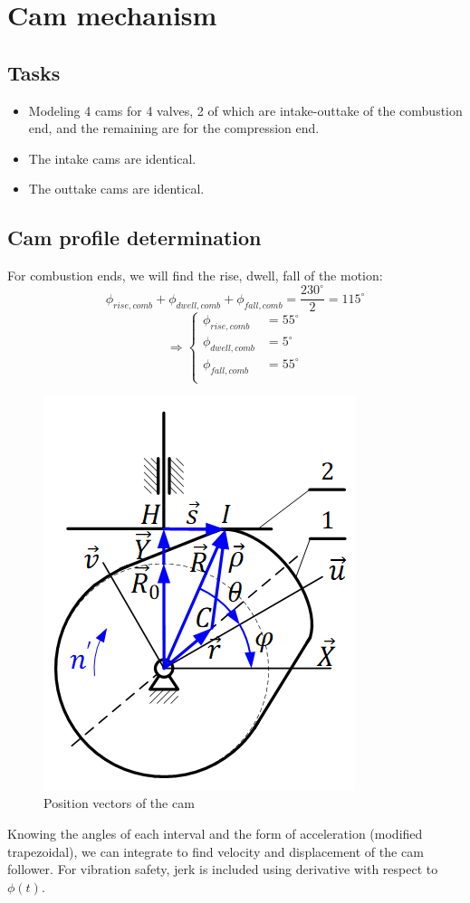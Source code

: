 \section{Cam mechanism}
\subsection{Tasks}
\begin{itemize}
	\item Modeling 4 cams for 4 valves, 2 of which are intake-outtake of the combustion end, and the remaining are for the compression end.
	\item The intake cams are identical.
	\item The outtake cams are identical.
\end{itemize}
\subsection{Cam profile determination}
For combustion ends, we will find the rise, dwell, fall of the motion:
\[\phi_{rise,comb}+\phi_{dwell,comb}+\phi_{fall,comb}=\dfrac{230^\circ}{2}=115^\circ\]
\[\Rightarrow\left\{\begin{array}{ll}
\phi_{rise,comb}&=55^\circ\\
\phi_{dwell,comb}&=5^\circ\\
\phi_{fall,comb}&=55^\circ\\
\end{array}\right.\]
\begin{figure}[h]
	\centering
	\includegraphics[width=0.4\linewidth]{26}
	\caption{Position vectors of the cam}
	\label{fig:26}
\end{figure}
Knowing the angles of each interval and the form of acceleration (modified trapezoidal), we can integrate to find velocity and displacement of the cam follower. For vibration safety, jerk is included using derivative with respect to $ \phi(t) $.
